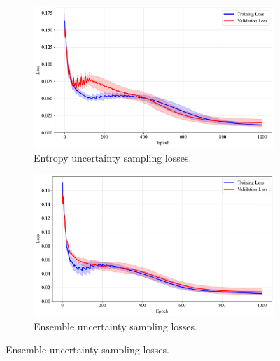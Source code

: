 \documentclass[10pt, conference]{IEEEtran}
\begin{document}
\begin{figure}[!t]
	\begin{subfigure}{\linewidth}
		\centering
		\includegraphics[width=\linewidth]{../results/iris/us_losses.pdf}
		\caption{Entropy uncertainty sampling losses.}
		\label{fig:us_losses}
	\end{subfigure}
	
	\vspace{0.1em}
	
	\begin{subfigure}{\linewidth}
		\centering
		\includegraphics[width=\linewidth]{../results/iris/ensemble_us_losses.pdf}
		\caption{Ensemble uncertainty sampling losses.}
		\label{fig:ensemble_us_losses}
	\end{subfigure}
\end{figure}
\end{document}
